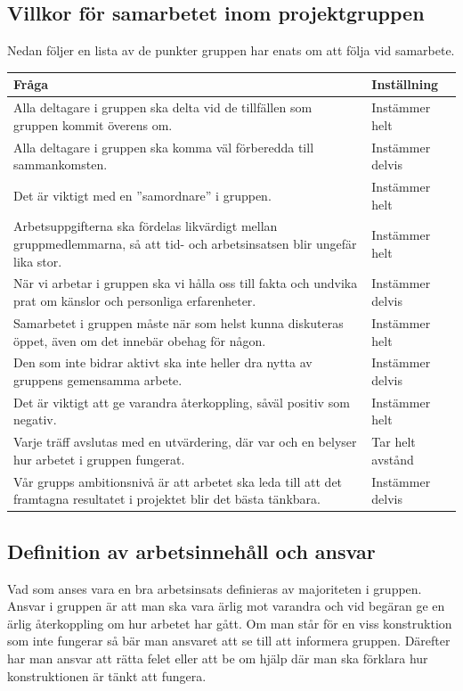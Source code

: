 \documentclass[projektplan/plan.tex]{subfiles}
\begin{document}
\noindent
\begin{minipage}{\textwidth}
\subsection{Villkor för samarbetet inom projektgruppen}
\label{sec:doc}
Nedan följer en lista av de punkter gruppen har enats om att följa vid samarbete.
{\renewcommand{\arraystretch}{1.6}
\begin{longtable}{p{}p{}}
    \bfseries Fråga &
    \bfseries Inställning \\\hline
    Alla deltagare i gruppen ska delta vid de tillfällen som gruppen kommit
    överens om. &
    Instämmer helt
    \\
    Alla deltagare i gruppen ska komma väl förberedda till sammankomsten. &
    Instämmer delvis
    \\
    Det är viktigt med en ”samordnare” i gruppen. &
    Instämmer helt
    \\
    Arbetsuppgifterna ska fördelas likvärdigt mellan gruppmedlemmarna, så att
    tid- och arbetsinsatsen blir ungefär lika stor. &
    Instämmer helt
    \\
    När vi arbetar i gruppen ska vi hålla oss till fakta och undvika prat om
    känslor och personliga erfarenheter. &
    Instämmer delvis
    \\
    Samarbetet i gruppen måste när som helst kunna diskuteras öppet, även om
    det innebär obehag för någon. &
    Instämmer helt
    \\
    Den som inte bidrar aktivt ska inte heller dra nytta av gruppens gemensamma
    arbete. &
    Instämmer delvis
    \\
    Det är viktigt att ge varandra återkoppling, såväl positiv som negativ. &
    Instämmer helt
    \\
    Varje träff avslutas med en utvärdering, där var och en belyser hur arbetet
    i gruppen fungerat. &
    Tar helt avstånd
    \\
    Vår grupps ambitionsnivå är att arbetet ska leda till att det framtagna
    resultatet i projektet blir det bästa tänkbara. &
    Instämmer delvis
    \\
\end{longtable}}
\end{minipage}

\newpage
\subsection{Definition av arbetsinnehåll och ansvar}
Vad som anses vara en bra arbetsinsats definieras av majoriteten i gruppen.
Ansvar i gruppen är att man ska vara ärlig mot varandra och vid begäran ge en
ärlig återkoppling om hur arbetet har gått. Om man står för en viss
konstruktion som inte fungerar så bär man ansvaret att se till att informera
gruppen. Därefter har man ansvar att rätta felet eller att be om hjälp där man
ska förklara hur konstruktionen är tänkt att fungera.
\end{document}
